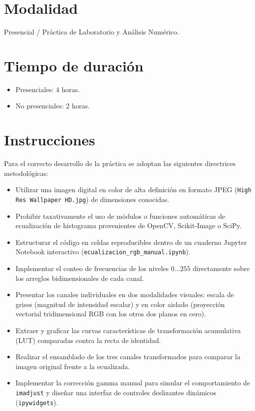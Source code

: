 \documentclass[12pt,a4paper]{article}
\begin{document}
\section{Modalidad}

Presencial / Práctica de Laboratorio y Análisis Numérico.

\section{Tiempo de duración}

\begin{itemize}
    \item Presenciales: 4 horas.
    \item No presenciales: 2 horas.
\end{itemize}

\section{Instrucciones}

Para el correcto desarrollo de la práctica se adoptan las siguientes directrices metodológicas:

\begin{itemize}
    \item Utilizar una imagen digital en color de alta definición en formato JPEG (\texttt{High Res Wallpaper HD.jpg}) de dimensiones conocidas.
    \item Prohibir taxativamente el uso de módulos o funciones automáticas de ecualización de histograma provenientes de OpenCV, Scikit-Image o SciPy.
    \item Estructurar el código en celdas reproducibles dentro de un cuaderno Jupyter Notebook interactivo (\texttt{ecualizacion\_rgb\_manual.ipynb}).
    \item Implementar el conteo de frecuencias de los niveles $0 \dots 255$ directamente sobre los arreglos bidimensionales de cada canal.
    \item Presentar los canales individuales en dos modalidades visuales: escala de grises (magnitud de intensidad escalar) y en color aislado (proyección vectorial tridimensional RGB con los otros dos planos en cero).
    \item Extraer y graficar las curvas características de transformación acumulativa (LUT) comparadas contra la recta de identidad.
    \item Realizar el ensamblado de los tres canales transformados para comparar la imagen original frente a la ecualizada.
    \item Implementar la corrección gamma manual para simular el comportamiento de \texttt{imadjust} y diseñar una interfaz de controles deslizantes dinámicos (\texttt{ipywidgets}).
\end{itemize}
\end{document}
